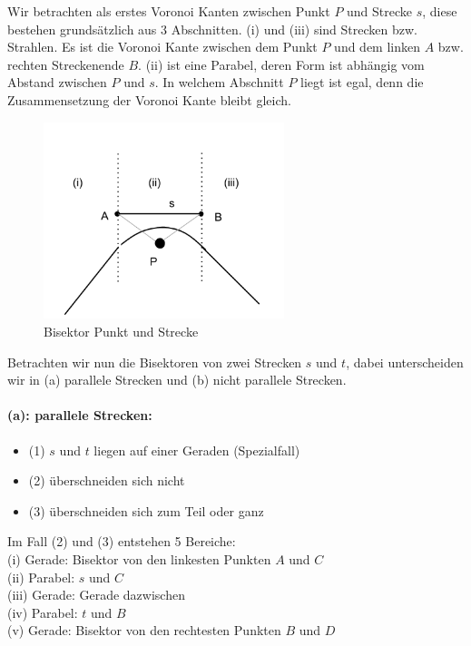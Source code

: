Wir betrachten als erstes Voronoi Kanten zwischen Punkt $P$ und Strecke $s$, diese bestehen grundsätzlich aus 3 Abschnitten. (i) und (iii) sind Strecken bzw. Strahlen. Es ist die Voronoi Kante zwischen dem Punkt $P$ und dem linken $A$ bzw. rechten Streckenende $B$. (ii) ist eine Parabel, deren Form ist abhängig vom Abstand zwischen $P$ und $s$. In welchem Abschnitt $P$ liegt ist egal, denn die Zusammensetzung der Voronoi Kante bleibt gleich.

\begin{figure}[h!]
\begin{center}
\includegraphics[width=7cm]{img/punkt-strecke.png}
\end{center}
\caption{Bisektor Punkt und Strecke}
\label{fig:c1}
\end{figure}

Betrachten wir nun die Bisektoren von zwei Strecken $s$ und $t$, dabei unterscheiden wir in (a) parallele Strecken und (b) nicht parallele Strecken.

\paragraph*{(a): parallele Strecken:}

\begin{itemize}
\item (1) $s$ und $t$ liegen auf einer Geraden (Spezialfall)
\item (2) überschneiden sich nicht
\item (3) überschneiden sich zum Teil oder ganz
\end{itemize}

Im Fall (2) und (3) entstehen 5 Bereiche:\\
(i) Gerade: Bisektor von den linkesten Punkten $A$ und $C$\\
(ii) Parabel: $s$ und $C$\\
(iii) Gerade: Gerade dazwischen\\
(iv) Parabel: $t$ und $B$\\
(v) Gerade: Bisektor von den rechtesten Punkten $B$ und $D$\\


